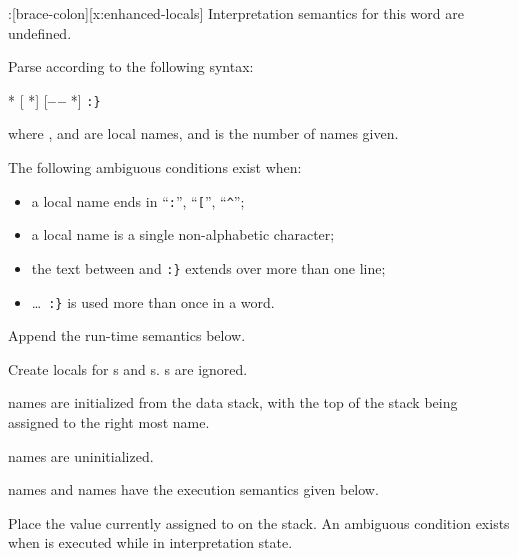 \begin{worddef*}[b:]{}{\brace:}[brace-colon][x:enhanced-locals]
\interpret
	Interpretation semantics for this word are undefined.

\compile

	Parse  according to the following syntax:
	\begin{center}
		 * [\textbf{\textbar} *] [\textbf{--\,--} *] \verb":}"
	\end{center}
	where ,  and  are local names, and
	 is the number of  names given.

	The following ambiguous conditions exist when:
	\begin{itemize}
	\item a local name ends in ``\texttt{:}'', ``\texttt{[}'', ``\texttt{\textasciicircum}'';
	\item a local name is a single non-alphabetic character;
	\item the text between  and \texttt{:\}} extends
			over more than one line;
	\item {} \ldots\ \texttt{:\}} is used more than once in a word.
	\end{itemize}

	Append the run-time semantics below. 

\runtime

	Create locals for s and s. s are ignored.

	\begin{list}{}{
		\setlength{\leftmargin}{2.6em}
		\setlength{\labelwidth}{2.4em}
	}
	\item[\arg{arg}] names are initialized from the data stack, with the
		top of the stack being assigned to the right most  name.

	\item[\arg{val}] names are uninitialized.
	\end{list}

	 names and  names have the execution semantics
		given below.

\execute[name]

	Place the value currently assigned to  on the stack.
	An ambiguous condition exists when  is executed while
	in interpretation state.



\end{worddef*}
